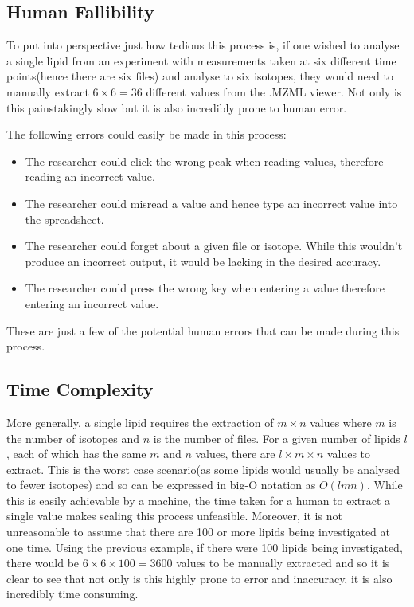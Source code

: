 \documentclass{l4proj}
\begin{document}
\subsection{Human Fallibility}
To put into perspective just how tedious this process is, if one wished to analyse a single lipid from an experiment with measurements taken at six different time points(hence there are six files) and analyse to six isotopes, they would need to manually extract $6\times6=36$ different values from the .MZML viewer. Not only is this painstakingly slow but it is also incredibly prone to human error.

The following errors could easily be made in this process:
\begin{itemize}
    \item The researcher could click the wrong peak when reading values, therefore reading an incorrect value.
    \item The researcher could misread a value and hence type an incorrect value into the spreadsheet.
    \item The researcher could forget about a given file or isotope. While this wouldn't produce an incorrect output, it would be lacking in the desired accuracy.
    \item The researcher could press the wrong key when entering a value therefore entering an incorrect value.
\end{itemize}
These are just a few of the potential human errors that can be made during this process. 


\subsection{Time Complexity}
 More generally, a single lipid requires the extraction of $m\times n$ values where $m$ is the number of isotopes and $n$ is the number of files. For a given number of lipids $l$, each of which has the same  $m$ and $n$ values, there are $l\times m\times n$ values to extract. This is the worst case scenario(as some lipids would usually be analysed to fewer isotopes) and so can be expressed in big-O notation as $O(lmn)$. While this is easily achievable by a machine, the time taken for a human to extract a single value makes scaling this process unfeasible. Moreover, it is not unreasonable to assume that there are 100 or more lipids being investigated at one time. Using the previous example, if there were 100 lipids being investigated, there would be $6\times6\times100=3600$ values to be manually extracted and so it is clear to see that not only is this highly prone to error and inaccuracy, it is also incredibly time consuming.
\end{document}
